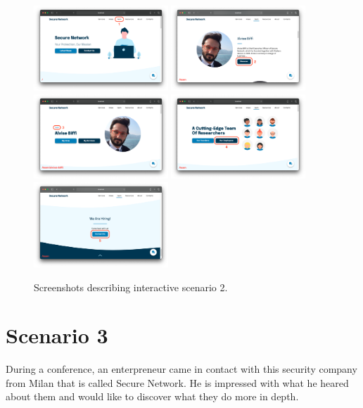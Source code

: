 \documentclass[12pt]{report}
\begin{document}
\begin{figure}[H]
	\centering
	\includegraphics[width=0.45\textwidth]{scenarios/2/1.png}
	\includegraphics[width=0.45\textwidth]{scenarios/2/2.png}
	\includegraphics[width=0.45\textwidth]{scenarios/2/3.png}
	\includegraphics[width=0.45\textwidth]{scenarios/2/4.png}
	\includegraphics[width=0.45\textwidth]{scenarios/2/5.png}
	\caption{Screenshots describing interactive scenario 2.}
\end{figure}

\clearpage
\section{Scenario 3}
During a conference, an enterpreneur came in contact with this security company from Milan that is called Secure Network.
He is impressed with what he heared about them and would like to discover what they do more in depth.
\end{document}
